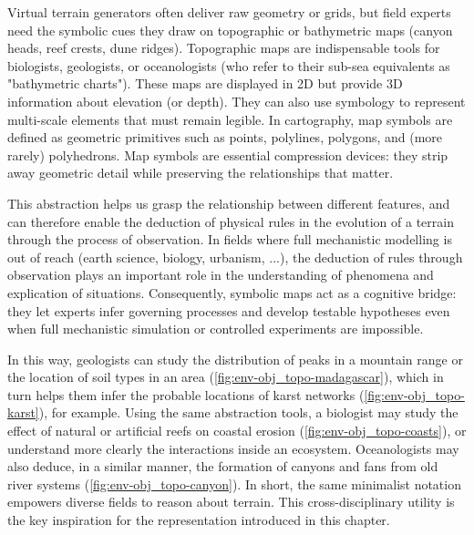 Virtual terrain generators often deliver raw geometry or grids, but field experts need the symbolic cues they draw on topographic or bathymetric maps (canyon heads, reef crests, dune ridges). Topographic maps are indispensable tools for biologists, geologists, or oceanologists (who refer to their sub-sea equivalents as "bathymetric charts"). These maps are displayed in 2D but provide 3D information about elevation (or depth). They can also use symbology to represent multi-scale elements that must remain legible. In cartography, map symbols are defined as geometric primitives such as points, polylines, polygons, and (more rarely) polyhedrons. Map symbols are essential compression devices: they strip away geometric detail while preserving the relationships that matter.

This abstraction helps us grasp the relationship between different features, and can therefore enable the deduction of physical rules in the evolution of a terrain through the process of observation. In fields where full mechanistic modelling is out of reach (earth science, biology, urbanism, ...), the deduction of rules through observation plays an important role in the understanding of phenomena and explication of situations. Consequently, symbolic maps act as a cognitive bridge: they let experts infer governing processes and develop testable hypotheses even when full mechanistic simulation or controlled experiments are impossible. 

In this way, geologists can study the distribution of peaks in a mountain range or the location of soil types in an area (\cref{fig:env-obj_topo-madagascar}), which in turn helps them infer the probable locations of karst networks (\cref{fig:env-obj_topo-karst}), for example. Using the same abstraction tools, a biologist may study the effect of natural or artificial reefs on coastal erosion (\cref{fig:env-obj_topo-coasts}), or understand more clearly the interactions inside an ecosystem. Oceanologists may also deduce, in a similar manner, the formation of canyons and fans from old river systems (\cref{fig:env-obj_topo-canyon}). In short, the same minimalist notation empowers diverse fields to reason about terrain. This cross-disciplinary utility is the key inspiration for the  representation introduced in this chapter.

